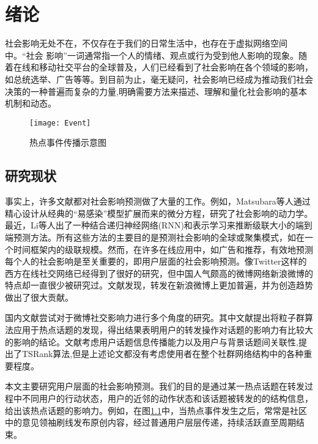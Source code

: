 
\chapter{绪论}

\label{chap:introduction}
社会影响无处不在，不仅存在于我们的日常生活中，也存在于虚拟网络空间中。“社会 影响”一词通常指一个人的情绪、观点或行为受到他人影响的现象。随着在线和移动社交平台的全球普及，人们已经看到了社会影响在各个领域的影响，如总统选举\cite{2012political}、广告\cite{v011a004}等等。到目前为止，毫无疑问，社会影响已经成为推动我们社会决策的一种普遍而复杂的力量,明确需要方法来描述、理解和量化社会影响的基本机制和动态。


\begin{figure}[!htbp]
    \centering
    \texttt{[image: Event]}
    \caption{热点事件传播示意图}
    \label{fig:Event}
\end{figure}

\section{研究现状}\label{sec:status}

事实上，许多文献都对社会影响预测做了大量的工作。例如，Matsubara等人\cite{Rise2012fall}通过精心设计从经典的“易感染”模型扩展而来的微分方程，研究了社会影响的动力学。最近，Li等人\cite{DBLP:journals/corr/LiMGM16}出了一种结合递归神经网络(RNN)和表示学习来推断级联大小的端到端预测方法。所有这些方法的主要目的是预测社会影响的全球或聚集模式，如在一个时间框架内的级联规模。然而，在许多在线应用中，如广告和推荐，有效地预测每个人的社会影响是至关重要的，即用户层面的社会影响预测。像Twitter这样的西方在线社交网络已经得到了很好的研究，但中国人气颇高的微博网络新浪微博的特点却一直很少被研究过。文献\cite{2012arXiv1202.0327Y}发现，转发在新浪微博上更加普遍，并为创造趋势做出了很大贡献。

国内文献\cite{2019TSRank}\cite{2016PSO}\cite{2018UserInfluenc}\cite{2015similarity}尝试对于微博社交影响力进行多个角度的研究。其中文献\cite{2016PSO}提出将粒子群算法应用于热点话题的发现，得出结果表明用户的转发操作对话题的影响力有比较大的影响的结论。文献\cite{2019TSRank}考虑用户话题信息传播能力以及用户与背景话题间关联性,提出了TSRank算法,但是上述论文都没有考虑使用者在整个社群网络结构中的各种重要程度。



本文主要研究用户层面的社会影响预测。我们的目的是通过某一热点话题在转发过程中不同用户的行动状态，用户的近邻的动作状态和该话题被转发的的结构信息，给出该热点话题的影响力。例如，在图\ref{fig:Event}中，当热点事件发生之后，常常是社区中的意见领袖刷线发布原创内容，经过普通用户层层传递，持续活跃直至周期结束。

